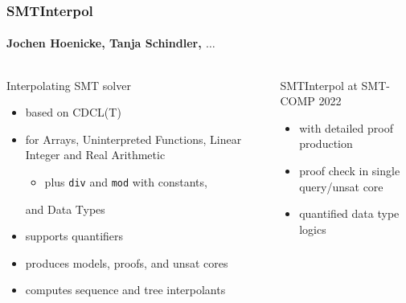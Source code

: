 \documentclass[table,aspectratio=169]{beamer}
\institute[Uni Freiburg]{University of Freiburg\hspace{1cm}\pgfuseimage{unifr}}
\begin{document}
\begin{frame}
  \frametitle{SMTInterpol}
  \framesubtitle{Jochen Hoenicke, Tanja Schindler, $\ldots$}
  
  \vspace{1ex}
  \begin{columns}[t]
  \begin{column}{.5\textwidth}
  Interpolating SMT solver
    \begin{itemize}
    \item based on CDCL(T)
      
    \item for Arrays, Uninterpreted Functions, Linear Integer and Real Arithmetic
    \begin{itemize}
      \item plus \texttt{div} and \texttt{mod} with constants,
    \end{itemize}
    and Data Types
    
    \item supports quantifiers
    
    \item produces models, proofs, and unsat cores
    
    \item computes sequence and tree interpolants
    \end{itemize}
  \end{column}
  
  \hfill\textcolor{ALUblue}{\vrule width 1pt }\hfill{}
  
  \begin{column}{.5\textwidth}
    SMTInterpol at SMT-COMP 2022
    \begin{itemize}
    \item with \alert{detailed proof production}
      
    \item \alert{proof check} in single query/unsat core
    
    \item \alert{quantified data type} logics
      
    \end{itemize}


\end{column}
\end{columns}
\end{frame}
\end{document}
